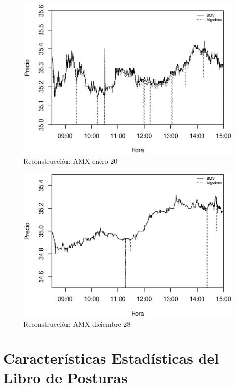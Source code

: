 \documentclass[11pt]{article}
\numberwithin{equation}{section} %
\begin{document}
\begin{figure}[htbp] \centering
\includegraphics[scale=0.75, trim=0 0.5cm 0 1.5cm]{amx012011.eps}
\caption{Reconstrucción: AMX enero 20}
\label{amx0120}
\end{figure}

\begin{figure}[htbp] \centering
\includegraphics[scale=0.75, trim=0 0.5cm 0 1.5cm]{amx122810.eps}
\caption{Reconstrucción: AMX diciembre 28}
\label{amx1228}
\end{figure}

\clearpage

\section{Características Estadísticas del Libro de Posturas}
\end{document}
